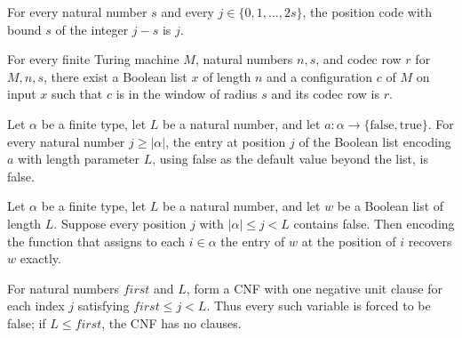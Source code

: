 \begin{theorem}
\label{Complexity.codec_posCode}
\leanok
{}
For every natural number $s$ and every $j\in\{0,1,\ldots,2s\}$, the position code with
bound $s$ of the integer $j-s$ is $j$.
\end{theorem}

\begin{theorem}
\label{Complexity.codecRow_realize}
\leanok
{}
For every finite Turing machine $M$, natural numbers $n,s$, and codec row $r$ for
$M,n,s$, there exist a Boolean list $x$ of length $n$ and a configuration $c$ of $M$ on
input $x$ such that $c$ is in the window of radius $s$ and its codec row is $r$.
\end{theorem}

\begin{theorem}
\label{Complexity.codecWord_padding}
\leanok
{}
Let $\alpha$ be a finite type, let $L$ be a natural number, and let
$a\colon\alpha\to\{\mathrm{false},\mathrm{true}\}$. For every natural number $j\ge
|\alpha|$, the entry at position $j$ of the Boolean list encoding $a$ with length
parameter $L$, using false as the default value beyond the list, is false.
\end{theorem}

\begin{theorem}
\label{Complexity.codecWord_reconstruct}
\leanok
{}
Let $\alpha$ be a finite type, let $L$ be a natural number, and let $w$ be a Boolean
list of length $L$. Suppose every position $j$ with $|\alpha|\le j<L$ contains false.
Then encoding the function that assigns to each $i\in\alpha$ the entry of $w$ at the
position of $i$ recovers $w$ exactly.
\end{theorem}

\begin{definition}
\label{Complexity.codecPadding}
\leanok
For natural numbers $first$ and $L$, form a CNF with one negative unit clause for each
index $j$ satisfying $first\le j<L$. Thus every such variable is forced to be false; if
$L\le first$, the CNF has no clauses.
\end{definition}

